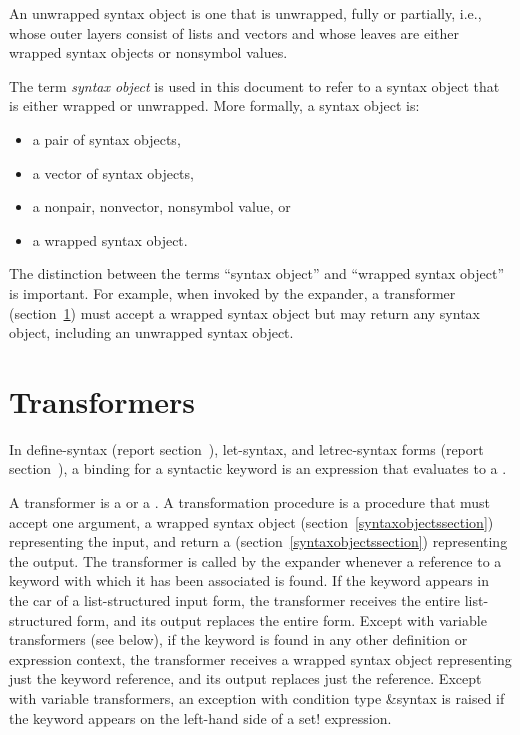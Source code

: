 An unwrapped syntax object is one that is unwrapped, fully or partially,
i.e., whose outer layers consist of lists and vectors and whose leaves are
either wrapped syntax objects or nonsymbol values.

The term \textit{syntax object} is used in this document to refer to
a syntax object that is either wrapped or unwrapped.
More formally, a syntax object is:

\begin{itemize}
\item a pair of syntax objects,
\item a vector of syntax objects,
\item a nonpair, nonvector, nonsymbol value, or
\item a wrapped syntax object.
\end{itemize}

The distinction between the terms ``syntax object'' and ``wrapped syntax
object'' is important.
For example, when invoked by the expander, a transformer
(section~\ref{transformerssection}) must accept a wrapped syntax object but
may return any syntax object, including an unwrapped syntax object.

\section{Transformers}
\label{transformerssection}

In {\cf define-syntax} (report
section~), {\cf
  let-syntax}, and {\cf letrec-syntax} forms (report
section~), a binding for a syntactic keyword is an expression
that evaluates to a .

A transformer is a  or a
.
A transformation procedure is a procedure that must accept one
argument, a wrapped syntax object (section~\ref{syntaxobjectssection})
representing the input, and return a 
(section~\ref{syntaxobjectssection}) representing the output.
The transformer is called by the expander whenever a reference to
a keyword with which it has been associated is found.
If the keyword appears in the car of a list-structured
input form, the transformer receives the entire list-structured
form, and its output replaces the entire form.
Except with variable transformers (see below),
if the keyword is found in any other definition or expression
context, the transformer receives a wrapped syntax object representing
just the keyword reference, and its output replaces just the reference.
Except with variable transformers, an exception with condition
type {\cf\&syntax} is raised if the keyword appears on the left-hand side
of a {\cf set!} expression.

